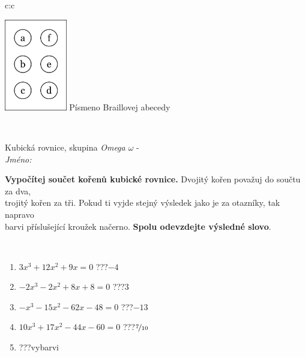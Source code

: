 \documentclass[10pt]{report}
\begin{document}
\begin{tabular}{c:c}
\begin{minipage}[c][104.5mm][t]{0.5\linewidth}
\begin{center}
\begin{minipage}{0.20\linewidth}
\begin{center}
\includegraphics[height=40mm]{../images/braille.png}
{\small Písmeno Braillovej abecedy}
\end{center}
\end{minipage}
\end{center}
\end{minipage}
\\ \hdashline
\begin{minipage}[c][104.5mm][t]{0.5\linewidth}
\begin{center}
\vspace{7mm}
{\huge Kubická rovnice, skupina \textit{Omega $\omega$} -}\\[5mm]
\textit{Jméno:}\phantom{xxxxxxxxxxxxxxxxxxxxxxxxxxxxxxxxxxxxxxxxxxxxxxxxxxxxxxxxxxxxxxxxx}\\[5mm]
\begin{minipage}{0.95\linewidth}
\begin{center}
\textbf{Vypočítej součet kořenů kubické rovnice.} Dvojitý kořen považuj do součtu za dva,\\trojitý kořen za tři. Pokud ti vyjde stejný výsledek jako je za otazníky, tak napravo\\barvi příslušející kroužek načerno. \textbf{Spolu odevzdejte výsledné slovo}.
\end{center}
\end{minipage}
\\[1mm]
\begin{minipage}{0.79\linewidth}
\begin{center}
\begin{varwidth}{\linewidth}
\begin{enumerate}
\Large
\item $3x^3+12x^2+9x=0$\quad \dotfill\; ???\;\dotfill \quad $-4$
\item $-2x^3-2x^2+8x+8=0$\quad \dotfill\; ???\;\dotfill \quad $3$
\item $-x^3-15x^2-62x-48=0$\quad \dotfill\; ???\;\dotfill \quad $-13$
\item $10x^3+17x^2-44x-60=0$\quad \dotfill\; ???\;\dotfill \quad $\nicefrac{7}{10}$
\item \quad \dotfill\; ???\;\dotfill \quad vybarvi

\end{enumerate}
\end{varwidth}
\end{center}
\end{minipage}
\end{center}
\end{minipage}
\end{tabular}
\end{document}
